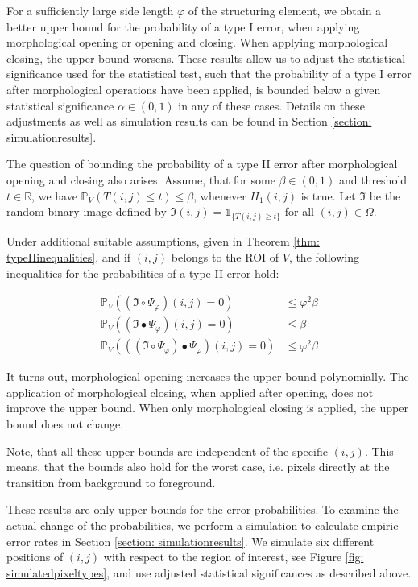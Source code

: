 \documentclass[a4paper,12pt]{article}
\theoremstyle{plain}
\theoremstyle{definition}
\numberwithin{equation}{section}
\begin{document}
For a sufficiently large side length $\varphi$ of the structuring element, we obtain a better upper bound for the probability of a type I error, when applying morphological opening or opening and closing. When applying morphological closing, the upper bound worsens. These results allow us to adjust the statistical significance used for the statistical test, such that the probability of a type I error after morphological operations have been applied, is bounded below a given statistical significance $\alpha \in (0, 1)$ in any of these cases. Details on these adjustments as well as simulation results can be found in Section \ref{section: simulationresults}.

The question of bounding the probability of a type II error after morphological opening and closing also arises. Assume, that for some $\beta \in (0, 1)$ and threshold $t \in \mathbb{R}$, we have $\mathbb{P}_V\left( T(i, j) \leq t \right) \leq \beta$, whenever $H_1(i, j)$ is true. Let $\mathfrak{I}$ be the random binary image defined by $\mathfrak{I}(i, j) = \mathds{1}_{ \{ T(i, j) \geq t \} }$ for all $(i, j) \in \Omega$.

Under additional suitable assumptions, given in Theorem \ref{thm: typeIIinequalities}, and if $(i, j)$ belongs to the ROI of $V$, the following inequalities for the probabilities of a type II error hold:
\begin{samepage}
	\begin{align}
		\mathbb{P}_V\left( (\mathfrak{I} \circ \Psi_\varphi)(i, j) = 0 \right) &\leq \varphi^2 \beta \\
		\mathbb{P}_V\left( (\mathfrak{I} \bullet \Psi_\varphi)(i, j) = 0 \right) &\leq \beta \\
		\mathbb{P}_V\left( ((\mathfrak{I} \circ \Psi_\varphi) \bullet \Psi_\varphi)(i, j) = 0 \right) &\leq \varphi^2 \beta
	\end{align}
\end{samepage}

It turns out, morphological opening increases the upper bound polynomially. The application of morphological closing, when applied after opening, does not improve the upper bound. When only morphological closing is applied, the upper bound does not change.

Note, that all these upper bounds are independent of the specific $(i, j)$. This means, that the bounds also hold for the worst case, i.e. pixels directly at the transition from background to foreground.

These results are only upper bounds for the error probabilities. To examine the actual change of the probabilities, we perform a simulation to calculate empiric error rates in Section \ref{section: simulationresults}. We simulate six different positions of $(i, j)$ with respect to the region of interest, see Figure \ref{fig: simulatedpixeltypes}, and use adjusted statistical significances as described above.
\end{document}
